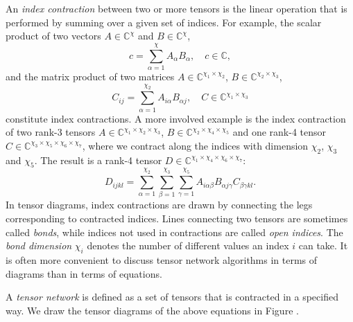 An \textit{index contraction} between two or more tensors is the linear operation that is performed by summing over a given set of indices. For example, the scalar product of two vectors $A\in\mathbb{C^\chi}$ and $B\in\mathbb{C^\chi}$,
\begin{equation}
	\label{eq:example_tensor_network_scalar_product}
	c = \sum_{\alpha=1}^{\chi}A_\alpha B_\alpha,\quad c\in\mathbb{C},
\end{equation}
and the matrix product of two matrices $A\in\mathbb{C}^{\chi_1\times\chi_2}$, $B\in\mathbb{C}^{\chi_2\times\chi_3}$,
\begin{equation}
	\label{eq:example_tensor_network_matrix_product}
	C_{ij} = \sum_{\alpha=1}^{\chi_2} A_{i\alpha} B_{\alpha j},\quad C\in\mathbb{C}^{\chi_1\times\chi_3}
\end{equation}
constitute index contractions. A more involved example is the index contraction of two rank-3 tensors $A\in\mathbb{C}^{\chi_1\times\chi_2\times\chi_3}$, $B\in\mathbb{C}^{\chi_2\times\chi_4\times\chi_5}$ and one rank-4 tensor $C\in\mathbb{C}^{\chi_3\times\chi_5\times\chi_6\times\chi_7}$, where we contract along the indices with dimension $\chi_2$, $\chi_3$ and $\chi_5$. The result is a rank-4 tensor $D\in\mathbb{C}^{\chi_1\times\chi_4\times\chi_6\times\chi_7}$:
\begin{equation}
	\label{eq:example_tensor_network_involved_network}
	D_{ijkl} = \sum_{\alpha=1}^{\chi_2} \sum_{\beta=1}^{\chi_3} \sum_{\gamma=1}^{\chi_5} A_{i \alpha \beta} B_{\alpha j\gamma} C_{\beta \gamma k l}.
\end{equation}
In tensor diagrams, index contractions are drawn by connecting the legs corresponding to contracted indices. Lines connecting two tensors are sometimes called \textit{bonds}, while indices not used in contractions are called \textit{open indices}. The \textit{bond dimension} $\chi_i$ denotes the number of different values an index $i$ can take. It is often more convenient to discuss tensor network algorithms in terms of diagrams than in terms of equations. \par
A \textit{tensor network} is defined as a set of tensors that is contracted in a specified way. We draw the tensor diagrams of the above equations in Figure .\par
